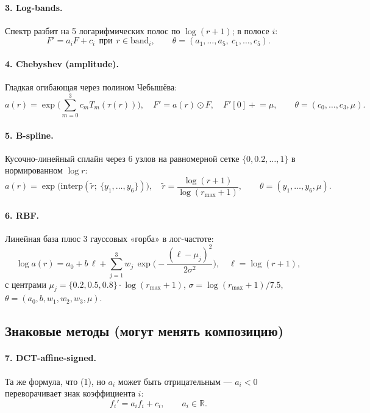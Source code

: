 \documentclass[11pt,a4paper]{article}
\newcommand{\bad}[1]{\textcolor{bad}{#1}}
\begin{document}
\paragraph{3. Log-bands.} Спектр разбит на 5 логарифмических полос по
$\log(r+1)$; в полосе $i$:
\begin{equation}
F' = a_i F + c_i \ \ \text{при}\ \ r \in \text{band}_i,
\qquad \theta = (a_1,\dots,a_5,\ c_1,\dots,c_5).
\end{equation}

\paragraph{4. Chebyshev (amplitude).} Гладкая огибающая через полином Чебышёва:
\begin{equation}
a(r) = \exp\!\Big(\sum_{m=0}^{3} c_m T_m(\tau(r))\Big), \quad
F' = a(r)\odot F,\quad F'[0]\mathrel{+}=\mu,
\qquad \theta = (c_0,\dots,c_3,\mu).
\end{equation}

\paragraph{5. B-spline.} Кусочно-линейный сплайн через 6 узлов на равномерной
сетке $\{0,0.2,\dots,1\}$ в нормированном $\log r$:
\begin{equation}
a(r) = \exp\!\big(\mathrm{interp}(\tilde r;\ \{y_1,\dots,y_6\})\big),
\quad \tilde r = \frac{\log(r+1)}{\log(r_{\max}+1)},
\qquad \theta = (y_1,\dots,y_6,\mu).
\end{equation}

\paragraph{6. RBF.} Линейная база плюс 3 гауссовых «горба» в лог-частоте:
\begin{equation}
\log a(r) = a_0 + b\,\ell + \sum_{j=1}^{3} w_j\,
\exp\!\Big(\!-\frac{(\ell - \mu_j)^2}{2\sigma^2}\Big),
\quad \ell = \log(r+1),
\end{equation}
с центрами $\mu_j = \{0.2,0.5,0.8\}\cdot\log(r_{\max}+1)$,
$\sigma = \log(r_{\max}+1)/7.5$, $\theta = (a_0,b,w_1,w_2,w_3,\mu)$.

\subsection*{Знаковые методы (могут менять композицию)}

\paragraph{7. DCT-affine-signed.} Та же формула, что (1), но $a_i$ может быть
отрицательным — $a_i < 0$ \bad{переворачивает знак} коэффициента $i$:
\begin{equation}
f_i' = a_i f_i + c_i, \qquad a_i \in \mathbb{R}.
\end{equation}
\end{document}
